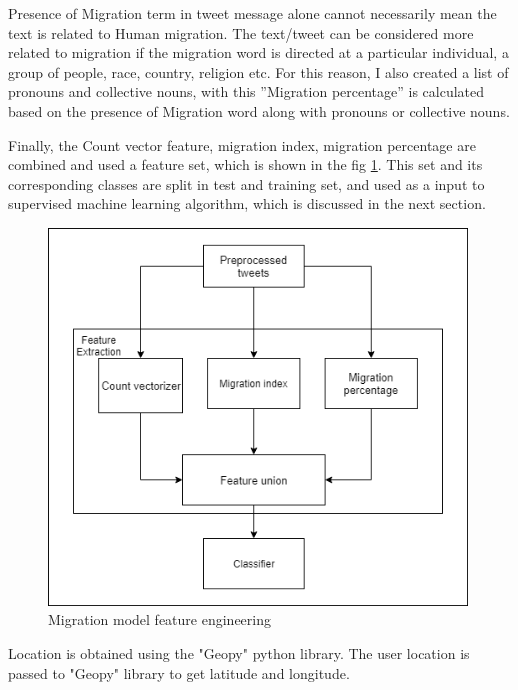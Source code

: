 Presence of Migration term in tweet message alone cannot necessarily mean the text is related
to Human migration. The text/tweet can be considered more related to migration if the migration word is directed at a particular individual, a group of
people, race, country, religion etc. For this reason, I also created a list of pronouns and collective nouns, with this ”Migration percentage” is calculated based on the presence of Migration word along with pronouns or collective nouns.




Finally, the Count vector feature, migration index, migration percentage are combined and used a feature set, which is shown in the fig \ref{fig:featureeng}. This set and its corresponding classes are split in test and training set, and used as a input to supervised machine learning algorithm, which is discussed in the next section.

\begin{figure}
	\centering
	\includegraphics[width=10cm\linewidth,height=10cm]{thesis_template/images/featureengineering.png}
	\caption{Migration model feature engineering}
	\label{fig:featureeng}
\end{figure}
    

Location is obtained using the "Geopy" python library. The user location is passed to "Geopy" library to get latitude and longitude. 



